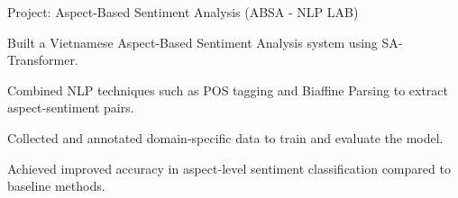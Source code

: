 \begin{cventries}
\vspace{8pt}

  \cventry
    {Project: Aspect-Based Sentiment Analysis (ABSA - NLP LAB)}
    {}
    {
      \begin{cvitems}
        \item {Built a Vietnamese Aspect-Based Sentiment Analysis system using SA-Transformer.}
        \item {Combined NLP techniques such as POS tagging and Biaffine Parsing to extract aspect-sentiment pairs.}
        \item {Collected and annotated domain-specific data to train and evaluate the model.}
        \item {Achieved improved accuracy in aspect-level sentiment classification compared to baseline methods.}
      \end{cvitems}
    }

\end{cventries}

